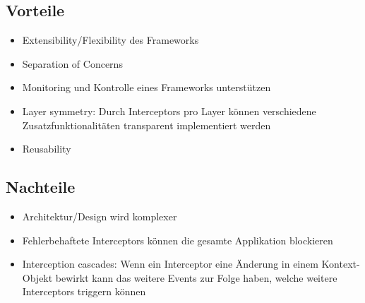 \subsection*{Vorteile}

\begin{itemize}
	\item Extensibility/Flexibility des Frameworks
	\item Separation of Concerns
	\item Monitoring und Kontrolle eines Frameworks unterstützen
	\item Layer symmetry: Durch Interceptors pro Layer können verschiedene Zusatzfunktionalitäten transparent implementiert werden
	\item Reusability
\end{itemize}


\subsection*{Nachteile}

\begin{itemize}
	\item Architektur/Design wird komplexer
	\item Fehlerbehaftete Interceptors können die gesamte Applikation blockieren
	\item Interception cascades: Wenn ein Interceptor eine Änderung in einem Kontext-Objekt bewirkt kann das weitere Events zur Folge haben, welche weitere Interceptors triggern können
\end{itemize}
